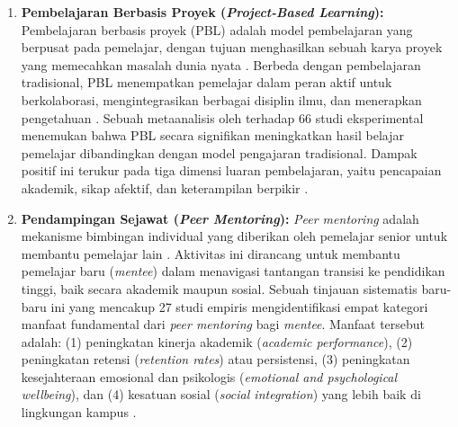 \begin{enumerate}
    Pentingnya menekankan aspek kognitif dan konstruktif
    didukung oleh temuan empiris bahwa fitur-fitur inilah
    yang menjadi prediktor kesuksesan revisi tugas.
    \textcite{Kerman2024} menemukan bahwa pemelajar yang sukses
    cenderung menerima umpan
    balik yang berfokus pada \textit{identification}
    (identifikasi masalah), sedangkan umpan balik yang murni
    afektif atau sekadar deskriptif lebih banyak
    diterima oleh pemelajar yang kurang berhasil. Hal ini
    menunjukkan bahwa untuk meningkatkan kompetensi, sistem
    harus mendorong pemelajar untuk memberikan komentar yang
    tidak hanya menyentuh aspek emosional, tetapi memberikan
    identifikasi masalah dan solusi konkret.
    
    \item \textbf{Pembelajaran Berbasis Proyek (\textit{Project-Based Learning}):} Pembelajaran berbasis proyek (PBL) adalah model pembelajaran yang
    berpusat pada pemelajar, dengan tujuan menghasilkan sebuah karya proyek yang memecahkan masalah dunia nyata \autocite{Zhang2023}. Berbeda
    dengan pembelajaran tradisional, PBL menempatkan pemelajar dalam peran aktif untuk
    berkolaborasi, mengintegrasikan berbagai disiplin ilmu, dan menerapkan pengetahuan
    \autocite{Ryoo2021}. Sebuah metaanalisis oleh \textcite{Zhang2023} terhadap 66 studi eksperimental
    menemukan bahwa PBL secara signifikan meningkatkan hasil belajar pemelajar
    dibandingkan dengan model pengajaran tradisional. Dampak
    positif ini terukur pada tiga dimensi luaran pembelajaran, yaitu
    pencapaian akademik, sikap afektif, dan keterampilan berpikir \autocite{Zhang2023}.

    \item \textbf{Pendampingan Sejawat (\textit{Peer Mentoring}):} \textit{Peer mentoring} adalah mekanisme bimbingan individual
    yang diberikan oleh pemelajar senior untuk membantu pemelajar lain \autocite{Le2024}.
    Aktivitas ini dirancang untuk membantu pemelajar baru (\textit{mentee}) dalam
    menavigasi tantangan transisi ke pendidikan tinggi, baik secara akademik maupun
    sosial. Sebuah tinjauan sistematis baru-baru ini yang mencakup 27 studi empiris
    mengidentifikasi empat kategori manfaat fundamental dari \textit{peer mentoring}
    bagi \textit{mentee}. Manfaat tersebut adalah: (1) peningkatan kinerja akademik
    (\textit{academic performance}), (2) peningkatan retensi
    (\textit{retention rates}) atau persistensi, (3) peningkatan kesejahteraan
    emosional dan psikologis (\textit{emotional and psychological wellbeing}), dan
    (4) kesatuan sosial (\textit{social integration}) yang lebih baik di
    lingkungan kampus \autocite{Le2024}.
    

\end{enumerate}
